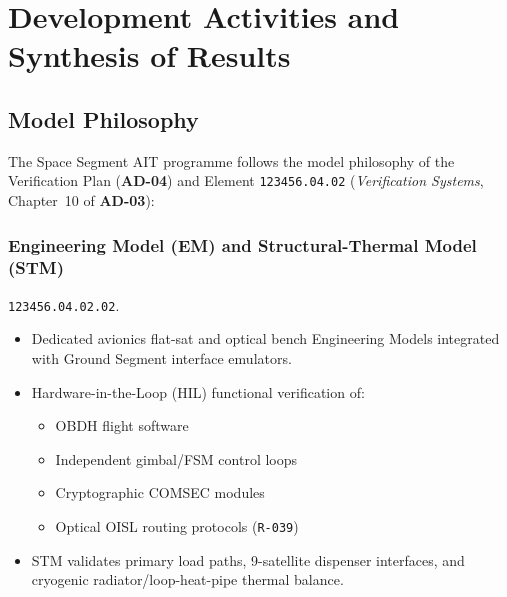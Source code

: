 \section{Development Activities and Synthesis of Results}
\label{sec:development_activities}

\subsection{Model Philosophy}

The Space Segment AIT programme follows the model philosophy of the Verification Plan (\textbf{AD-04}) and  Element \texttt{123456.04.02} (\emph{Verification Systems}, Chapter~10 of \textbf{AD-03}):

\subsubsection{Engineering Model (EM) and Structural-Thermal Model (STM)}
 \texttt{123456.04.02.02}.
\begin{itemize}
    \item Dedicated avionics flat-sat and optical bench Engineering Models integrated with Ground Segment interface emulators.
    \item Hardware-in-the-Loop (HIL) functional verification of:
    \begin{itemize}
        \item OBDH flight software
        \item Independent gimbal/FSM control loops
        \item Cryptographic COMSEC modules
        \item Optical OISL routing protocols (\texttt{R-039})
    \end{itemize}
    \item STM validates primary load paths, 9-satellite dispenser interfaces, and cryogenic radiator/loop-heat-pipe thermal balance.
\end{itemize}

